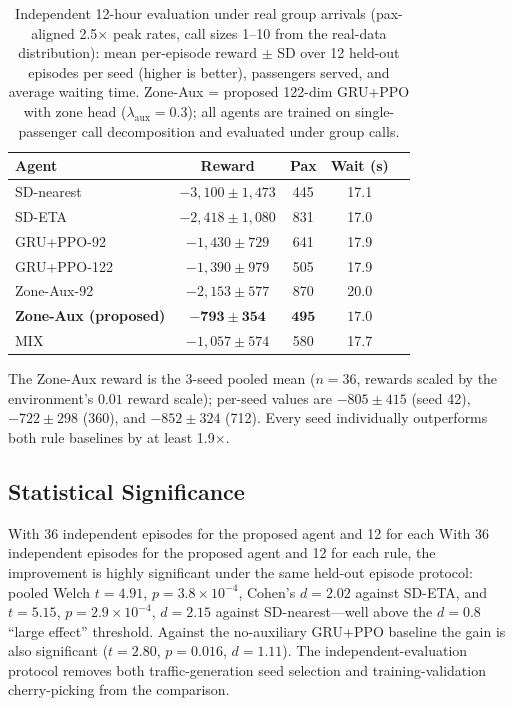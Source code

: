 \documentclass{ieeeaccess}
\begin{document}
\begin{table}[t]
\centering
\caption{Independent 12-hour evaluation under real group arrivals
(pax-aligned 2.5$\times$ peak rates, call sizes 1--10 from the
real-data distribution): mean per-episode reward $\pm$ SD over 12
held-out episodes per seed (higher is better), passengers served, and
average waiting time. Zone-Aux = proposed 122-dim GRU+PPO with zone
head ($\lambda_{\text{aux}} = 0.3$); all agents are trained on
single-passenger call decomposition and evaluated under group calls.}
\label{tab:main_results}
\begin{tabular}{@{}lcccc@{}}
\toprule
Agent & Reward & Pax & Wait (s) \\
\midrule
SD-nearest & $-3{,}100 \pm 1{,}473$ & 445 & 17.1 \\
SD-ETA     & $-2{,}418 \pm 1{,}080$ & 831 & 17.0 \\
GRU+PPO-92 & $-1{,}430 \pm 729$ & 641 & 17.9 \\
GRU+PPO-122 & $-1{,}390 \pm 979$ & 505 & 17.9 \\
Zone-Aux-92 & $-2{,}153 \pm 577$ & 870 & 20.0 \\
\textbf{Zone-Aux (proposed)} & $\mathbf{-793 \pm 354}$ &
$\mathbf{495}$ & $\mathbf{17.0}$ \\
MIX & $-1{,}057 \pm 574$ & 580 & 17.7 \\
\bottomrule
\end{tabular}
\end{table}

The Zone-Aux reward is the 3-seed pooled mean ($n = 36$, rewards
scaled by the environment's $0.01$ reward scale); per-seed values are
$-805 \pm 415$ (seed 42), $-722 \pm 298$ (360), and $-852 \pm 324$
(712). Every seed individually outperforms both rule baselines by at
least 1.9$\times$.

\subsection{Statistical Significance}

With 36 independent episodes for the proposed agent and 12 for each
With 36 independent episodes for the proposed agent and 12 for each
rule, the improvement is highly significant under the same held-out
episode protocol: pooled Welch $t = 4.91$, $p = 3.8\times10^{-4}$,
Cohen's $d = 2.02$ against SD-ETA, and $t = 5.15$, $p = 2.9\times
10^{-4}$, $d = 2.15$ against SD-nearest---well above the $d = 0.8$
``large effect'' threshold. Against the no-auxiliary GRU+PPO baseline
the gain is also significant ($t = 2.80$, $p = 0.016$, $d = 1.11$).
The independent-evaluation protocol removes both traffic-generation
seed selection and training-validation cherry-picking from the
comparison.
\end{document}
